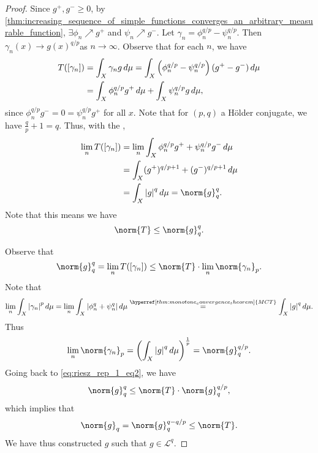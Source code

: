 \documentclass[notoc,notitlepage]{tufte-book}
\begin{document}
\begin{proof}
  Since $g^+, g^- \geq 0$, by
  \cref{thm:increasing_sequence_of_simple_functions_converges_an_arbitrary_measurable_function},
  $\exists \phi_n \nearrow g^+$ and $\psi_n \nearrow g^-$.
  Let $\gamma_n = \phi_n^{q / p} - \psi_n^{q / p}$.
  Then $\gamma_n(x) \to g(x)^{q / p}$as $n \to \infty$.
  Observe that for each $n$, we have
  \begin{align*}
    T([\gamma_n])
    &= \int_{X} \gamma_n g \mathop{}\!d{\mu}
     = \int_{X} \left( \phi_n^{q / p} - \psi_n^{q / p} \right) (g^+ - g^-) \mathop{}\!d{\mu} \\
    &= \int_{X} \phi_n^{q / p} g^+ \mathop{}\!d{\mu} + \int_{X} \psi_n^{q / p} g \mathop{}\!d{\mu},
  \end{align*}
  since $\phi_n^{q / p} g^- = 0 = \psi_n^{q / p} g^+$ for all $x$.
  Note that for $(p, q)$ a Hölder conjugate, we have $\frac{q}{p} + 1 = q$.
  Thus, with the ,
  \begin{align*}
    \lim_{n} T([\gamma_n])
    &= \lim_{n} \int_{X} \phi_n^{q / p} g^+ + \psi_n^{q / p} g^- \dif{\mu} \\
    &= \int_{X} (g^+)^{q / p + 1} + (g^-)^{q / p + 1} \dif{\mu} \\
    &= \int_{X} \abs{g}^q \dif{\mu} = \norm{g}_q^q.
  \end{align*}
  Note that this means we have
  \begin{equation*}
    \norm{T} \leq \norm{g}_q^q.
  \end{equation*}
  
  Observe that
  \begin{equation}\label{eq:riesz_rep_1_eq2}
    \norm{g}_q^q = \lim_{n} T([\gamma_n]) \leq \norm{T} \cdot \lim_{n}
    \norm{\gamma_n}_p.
  \end{equation}
  Note that
  \begin{equation*}
    \lim_{n} \int_{X} \abs{\gamma_n}^p \dif{\mu}
    = \lim_{n} \int_{X} \abs{\phi_n^q + \psi_n^q} \dif{\mu}
    \overset{\hyperref[thm:monotone_convergence_theorem]{MCT}}{=}
    \int_{X} \abs{g}^q \dif{\mu}.
  \end{equation*}
  Thus
  \begin{equation*}
    \lim_{n} \norm{\gamma_n}_p = \left( \int_{X} \abs{g}^q \dif{\mu} \right)^{\frac{1}{p}}
    = \norm{g}_q^{q / p}.
  \end{equation*}
  Going back to \cref{eq:riesz_rep_1_eq2}, we have
  \begin{equation*}
    \norm{g}_q^q \leq \norm{T} \cdot \norm{g}_q^{q / p},
  \end{equation*}
  which implies that
  \begin{equation*}
    \norm{g}_q = \norm{g}_q^{q - q / p} \leq \norm{T}.
  \end{equation*}
  We have thus constructed $g$ such that $g \in \mathcal{L}^q$.


\end{proof}
\end{document}
